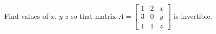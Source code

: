 Find values of $x$, $y$ $z$ so that matrix 
$A = 
\begin{bmatrix} 
1 & 2 & x\\ 
3 & 0 & y \\ 
1 & 1 & z 
\end{bmatrix}$ 
is invertible.